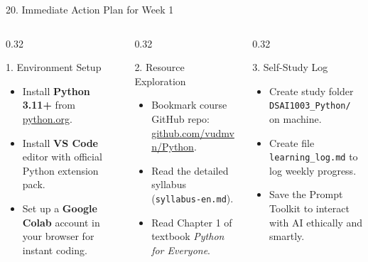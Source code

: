 \documentclass[aspectratio=169, 10pt]{beamer}
\begin{document}
\begin{frame}{20. Immediate Action Plan for Week 1}
  \begin{columns}[T]
    \begin{column}{0.32\textwidth}
      \begin{cbox}[primaryblue]{1. Environment Setup}
        \scriptsize
        \begin{itemize}\setlength{\itemsep}{2pt}
          \item Install \textbf{Python 3.11+} from \url{python.org}.
          \item Install \textbf{VS Code} editor with official Python extension pack.
          \item Set up a \textbf{Google Colab} account in your browser for instant coding.
        \end{itemize}
      \end{cbox}
    \end{column}
    \begin{column}{0.32\textwidth}
      \begin{cbox}[secondarygreen]{2. Resource Exploration}
        \scriptsize
        \begin{itemize}\setlength{\itemsep}{2pt}
          \item Bookmark course GitHub repo: \url{github.com/vudmvn/Python}.
          \item Read the detailed syllabus (\texttt{syllabus-en.md}).
          \item Read Chapter 1 of textbook \textit{Python for Everyone}.
        \end{itemize}
      \end{cbox}
    \end{column}
    \begin{column}{0.32\textwidth}
      \begin{cbox}[accentorange]{3. Self-Study Log}
        \scriptsize
        \begin{itemize}\setlength{\itemsep}{2pt}
          \item Create study folder \texttt{DSAI1003\_Python/} on machine.
          \item Create file \texttt{learning\_log.md} to log weekly progress.
          \item Save the Prompt Toolkit to interact with AI ethically and smartly.

\end{itemize}
\end{cbox}
\end{column}
\end{columns}
\end{frame}
\end{document}
